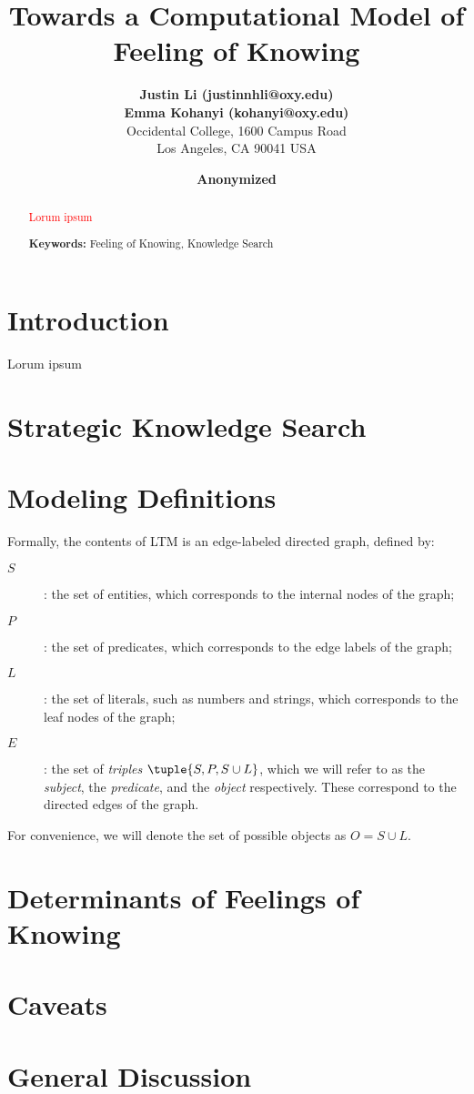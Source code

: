 \documentclass[10pt,letterpaper]{article}
\author{
        {\large \bf Justin Li (justinnhli@oxy.edu)} \\
        {\large \bf Emma Kohanyi (kohanyi@oxy.edu)} \\
        Occidental College, 1600 Campus Road \\
        Los Angeles, CA 90041 USA
    }
\title{Towards a Computational Model of Feeling of Knowing}
\author{
    {\large \bf Anonymized}
}
\newcommand{\fixme}[2][]{#2}
\renewcommand{\fixme}[2][]{\textcolor{red}{#2}}
\begin{document}
\maketitle

\begin{abstract}

    \fixme{Lorum ipsum}

    \textbf{Keywords:} Feeling of Knowing, Knowledge Search

\end{abstract}

\section{Introduction}

Lorum ipsum \cite{Li2016ArchitecturalMechanismsFor}


\section{Strategic Knowledge Search}

\section{Modeling Definitions}

Formally, the contents of LTM is an edge-labeled directed graph, defined by:

\begin{description}
    \item[$S$]: the set of entities, which corresponds to the internal nodes of the graph;
    \item[$P$] : the set of predicates, which corresponds to the edge labels of the graph;
    \item[$L$] : the set of literals, such as numbers and strings, which corresponds to the leaf nodes of the graph;
    \item[$E$] : the set of \emph{triples} $\tuple{S, P, S \cup L}$, which we will refer to as the \emph{subject}, the \emph{predicate}, and the \emph{object} respectively. These correspond to the directed edges of the graph.
\end{description}

For convenience, we will denote the set of possible objects as $O = S \cup L$.

\section{Determinants of Feelings of Knowing}

\section{Caveats}

\section{General Discussion}



\setlength{\bibleftmargin}{.125in}
\setlength{\bibindent}{-\bibleftmargin}


\end{document}
